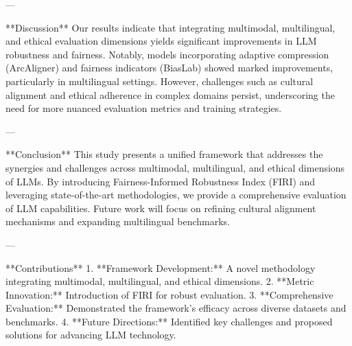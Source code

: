 ---

**Discussion**  
Our results indicate that integrating multimodal, multilingual, and ethical evaluation dimensions yields significant improvements in LLM robustness and fairness. Notably, models incorporating adaptive compression (ArcAligner) and fairness indicators (BiasLab) showed marked improvements, particularly in multilingual settings. However, challenges such as cultural alignment and ethical adherence in complex domains persist, underscoring the need for more nuanced evaluation metrics and training strategies.

---

**Conclusion**  
This study presents a unified framework that addresses the synergies and challenges across multimodal, multilingual, and ethical dimensions of LLMs. By introducing Fairness-Informed Robustness Index (FIRI) and leveraging state-of-the-art methodologies, we provide a comprehensive evaluation of LLM capabilities. Future work will focus on refining cultural alignment mechanisms and expanding multilingual benchmarks.

---

**Contributions**  
1. **Framework Development:** A novel methodology integrating multimodal, multilingual, and ethical dimensions.  
2. **Metric Innovation:** Introduction of FIRI for robust evaluation.  
3. **Comprehensive Evaluation:** Demonstrated the framework's efficacy across diverse datasets and benchmarks.  
4. **Future Directions:** Identified key challenges and proposed solutions for advancing LLM technology.

